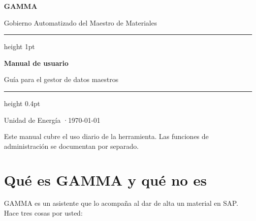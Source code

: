 %
%




\begin{titlepage}
\thispagestyle{empty}
\vspace*{5.5cm}
{\fontsize{46}{50}\selectfont\bfseries\color{fg} GAMMA\par}
\vspace{0.5em}
{\large\color{muted} Gobierno Automatizado del Maestro de Materiales\par}

\vspace{2.6cm}
{\color{line}\hrule height 1pt}
\vspace{1.2em}

{\huge\bfseries\color{fg} Manual de usuario\par}
\vspace{0.5em}
{\large\color{muted} Guía para el gestor de datos maestros\par}

\vfill
{\color{line}\hrule height 0.4pt}
\vspace{1em}
{\footnotesize\color{muted}
Unidad de Energía \quad·\quad \today\par
\vspace{0.4em}
Este manual cubre el uso diario de la herramienta.
Las funciones de administración se documentan por separado.\par}
\vspace{1cm}
\end{titlepage}

\tableofcontents
\newpage

\section{Qué es GAMMA y qué no es}

GAMMA es un asistente que lo acompaña al dar de alta un material en SAP. Hace
tres cosas por usted:

